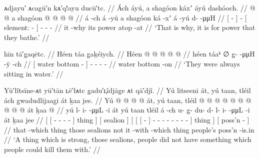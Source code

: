 


\ex\label{ex:93-51-bathe-for-shagoon}%
%
\begingl
	\glpreamble	 ᴀdjayu′ ᴀcagū′n kᴀ′q!ayu ducū′tc. //
	\glpreamble	Ách áyú, a shagóon káxʼ áyú dashóoch. //
	\gla	{}  @ {} {}
		 @ {}
		{} a shagóon  @ {} {}
		 @ {}
		 @ {} @ {} //
	\glb	{} á -ch {}
		á -yú
		{} a shagóon ká -xʼ {}
		á -yú
		d-  -μμH //
	\glc	{}[  - {}]
		 -
		{}[  element:  - {}]
		 -
		-  - //
	\gld	{} it -why {}
		 {}
		{} its power atop -at {}
		 {}
		 {} {} //
	\glft	‘That is why, it is for power that they bathe.’
		//
\endgl
\xe


\ex\label{ex:93-52-always-sit-in-water}%
%
\begingl
	\glpreamble	hīn tā′g̣aqētc. //
	\glpreamble	Héen táa g̱aḵéiych. //
	\gla	{} Héen  @ {} {}
		 @ {} @ {} @ {} @ {} //
	\glb	{} héen táaᵏ \·∅ {}
		g̱-  -μμH -ÿ -ch //
	\glc	{}[ water bottom - {}]
		-  - - - //
	\gld	{} water bottom -on {}
		 {} {} {} {} //
	\glft	‘They were always sitting in water.’
		//
\endgl
\xe

\ex\label{ex:93-53-nothing-to-kill-them}%
%
\begingl
	\glpreamble	Yū′łîtsīne-ᴀt yū′tān ʟē′łᴀtc g̣adu′ʟ̣îdjāg̣e ᴀt qā′djî. //
	\glpreamble	Yú litseeni át, yú taan, tléil ách g̱wadudlijaag̱i át ḵaa jee. //
	\gla	{} Yú {}  @ {} @ {} @ {} @ {} {} át, {}
		{} yú taan, {}
		tléil
		{} {} {}  @ {} {}
				 @ {} @ {} @ {} @ {} @ {} @ {} @ {} @ {} @ {} {}
			át {}
		{} ḵaa  @ {} {} //
	\glb	{} yú {} l- i-  -μμL -i {} át {}
		{} yú taan {}
		tléil 
		{} {} {} á -ch {}
				u- {} g̱- du- d- l- i-  -μμL -i {}
			át {}
		{} ḵaa jee {} {} //
	\glc	{}[  {}[ - -  - - {}] thing {}]
		{}[  sealion {}]
		{}[ {}[ {}[  - {}]
				- \· - - - - - 
					- - {}]
			thing {}]
		{}[  poss’n - {}] //
	\gld	{} that {}  {} {} {} -which {} thing {}
		{} those sealions {}
		not
		{} {} {} it -with {}
				 {} {} {} {} {} {} {} {} -which {}
			thing {}
		{} people’s poss’n -is.in {} //
	\glft	‘A thing which is strong, those sealions,
		people did not have something which people could kill them with.’
		//
\endgl
\xe

